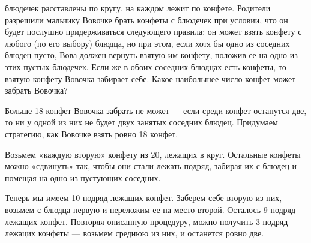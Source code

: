 
\begin{itemize}

	 блюдечек расставлены по кругу, на каждом лежит по конфете. Родители разрешили мальчику Вовочке брать конфеты с блюдечек при условии, что он будет послушно придерживаться следующего правила: он может взять конфету с любого (по его выбору) блюдца, но при этом, если хотя бы одно из соседних блюдец пусто, Вова должен вернуть взятую им конфету, положив ее на одно из этих пустых блюдечек. Если же в обоих соседних блюдцах есть конфеты, то взятую конфету Вовочка забирает себе. Какое наибольшее число конфет может забрать Вовочка?
	
	\itr Больше 18 конфет Вовочка забрать не может — если среди конфет останутся две, то ни у одной из них не будет двух занятых соседних блюдец. Придумаем стратегию, как Вовочке взять ровно 18 конфет.
	
	Возьмем «каждую вторую» конфету из 20, лежащих в круг. Остальные конфеты можно «сдвинуть» так, чтобы они стали лежать подряд, забирая их с блюдец и помещая на одно из пустующих соседних.
	
	Теперь мы имеем 10 подряд лежащих конфет. Заберем себе вторую из них, возьмем с блюдца первую и переложим ее на место второй. Осталось 9 подряд лежащих конфет. Повторяя описанную процедуру, можно получить 3 подряд лежацих конфеты — возьмем среднюю из них, и останется ровно две.

\end{itemize}